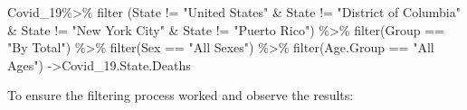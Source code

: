 \documentclass[
]{article}
\newenvironment{Shaded}{\begin{snugshade}}{\end{snugshade}}
\newcommand{\FunctionTok}[1]{\textcolor[rgb]{0.00,0.00,0.00}{#1}}
\newcommand{\NormalTok}[1]{#1}
\newcommand{\OtherTok}[1]{\textcolor[rgb]{0.56,0.35,0.01}{#1}}
\newcommand{\SpecialCharTok}[1]{\textcolor[rgb]{0.00,0.00,0.00}{#1}}
\newcommand{\StringTok}[1]{\textcolor[rgb]{0.31,0.60,0.02}{#1}}
\begin{document}
\begin{Shaded}
\begin{Highlighting}[]
\NormalTok{Covid\_19}\SpecialCharTok{\%\textgreater{}\%}
  \FunctionTok{filter}\NormalTok{ (State }\SpecialCharTok{!=} \StringTok{"United States"} \SpecialCharTok{\&}\NormalTok{ State }\SpecialCharTok{!=} \StringTok{"District of Columbia"} \SpecialCharTok{\&}\NormalTok{ State }\SpecialCharTok{!=} \StringTok{"New York City"} \SpecialCharTok{\&}\NormalTok{ State }\SpecialCharTok{!=} \StringTok{"Puerto Rico"}\NormalTok{) }\SpecialCharTok{\%\textgreater{}\%}
  \FunctionTok{filter}\NormalTok{(Group }\SpecialCharTok{==} \StringTok{"By Total"}\NormalTok{) }\SpecialCharTok{\%\textgreater{}\%}
  \FunctionTok{filter}\NormalTok{(Sex }\SpecialCharTok{==} \StringTok{"All Sexes"}\NormalTok{) }\SpecialCharTok{\%\textgreater{}\%} 
  \FunctionTok{filter}\NormalTok{(Age.Group }\SpecialCharTok{==} \StringTok{"All Ages"}\NormalTok{) }\OtherTok{{-}\textgreater{}}\NormalTok{Covid\_19.State.Deaths}
\end{Highlighting}
\end{Shaded}

To ensure the filtering process worked and observe the results:

\begin{Shaded}
\end{Shaded}
\end{document}
